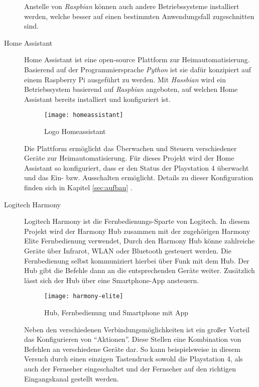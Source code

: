 \begin{description}
        Anstelle von \textit{Raspbian} können auch andere Betriebssysteme installiert werden,
        welche besser auf einen bestimmten Anwendungsfall zugeschnitten sind.

    \newpage

    \item[Home Assistant \cite{HomeAssi51:online}]
        Home Assistant ist eine open-source Plattform zur Heimautomatisierung.
        Basierend auf der Programmiersprache \textit{Python} ist sie dafür konzipiert
        auf einem Raspberry Pi ausgeführt zu werden.
        Mit \textit{Hassbian} wird ein Betriebssystem basierend auf \textit{Raspbian} angeboten,
        auf welchen Home Assistant bereits installiert und konfiguriert ist.

        \begin{figure}[h!]
            \centering
            \texttt{[image: homeassistant]}
            \caption{Logo Homeassistant}\label{fig:homeassistant}
        \end{figure}

        Die Plattform ermöglicht das Überwachen und Steuern verschiedener Geräte zur Heimautomatisierung.
        Für dieses Projekt wird der Home Assistant so konfiguriert,
        dass er den Status der Playstation 4 überwacht und das Ein- bzw. Ausschalten ermöglicht.
        Details zu dieser Konfiguration finden sich in Kapitel \ref{sec:aufbau} \textit{}.

    \newpage

    \item[Logitech Harmony \cite{HarmonyH15:online}]
        Logitech Harmony ist die Fernbedienungs-Sparte von Logitech.
        In diesem Projekt wird der Harmony Hub zusammen mit der zugehörigen Harmony Elite Fernbedienung verwendet,
        Durch den Harmony Hub könne zahlreiche Geräte über Infrarot, WLAN oder Bluetooth gesteuert werden.
        Die Fernbedienung selbst kommuniziert hierbei über Funk \cite{HowToPoi90:online} mit dem Hub.
        Der Hub gibt die Befehle dann an die entsprechenden Geräte weiter.
        Zusätzlich lässt sich der Hub über eine Smartphone-App ansteuern.

        \begin{figure}[h!]
            \centering
            \texttt{[image: harmony-elite]}
            \caption{Hub, Fernbedienung und Smartphone mit App}\label{fig:harmony}
        \end{figure}

        Neben den verschiedenen Verbindungsmöglichkeiten ist ein großer Vorteil das Konfigurieren von \enquote{Aktionen}.
        Diese Stellen eine Kombination von Befehlen an verschiedene Geräte dar.
        So kann beispielsweise in diesem Versuch durch einen einzigen Tastendruck sowohl die Playstation 4,
        als auch der Fernseher eingeschaltet und der Fernseher auf den richtigen Eingangskanal gestellt werden.
\end{description}